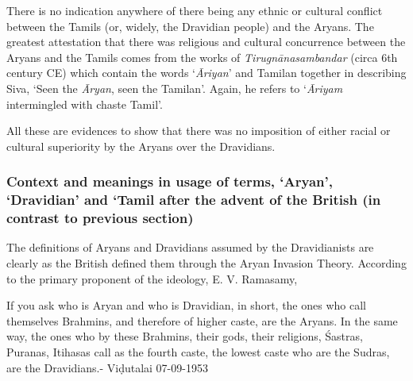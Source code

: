 There is no indication anywhere of there being any ethnic or cultural conflict between the Tamils (or, widely, the Dravidian people) and the Aryans. The greatest attestation that there was religious and cultural concurrence between the Aryans and the Tamils comes from the works of \textit{Tirugnānasambandar} (circa 6th century CE) which contain the words ‘\textit{Āriyan}’ and Tamilan together in describing Siva, ‘Seen the \textit{Āryan}, seen the Tamilan’. Again, he refers to ‘\textit{Āriyam} intermingled with chaste Tamil’.

All these are evidences to show that there was no imposition of either racial or cultural superiority by the Aryans over the Dravidians.


\subsubsection{Context and meanings in usage of terms, ‘Aryan’, ‘Dravidian’ and ‘Tamil after the advent of the British (in contrast to previous section)}

The definitions of Aryans and Dravidians assumed by the Dravidianists are clearly as the British defined them through the Aryan Invasion Theory. According to the primary proponent of the ideology, E. V. Ramasamy,

\begin{myquote}
If you ask who is Aryan and who is Dravidian, in short, the ones who call themselves Brahmins, and therefore of higher caste, are the Aryans. In the same way, the ones who by these Brahmins, their gods, their religions, Śastras, Puranas, Itihasas call as the fourth caste, the lowest caste who are the Sudras, are the Dravidians.\hfill - Viḍutalai 07-09-1953
\end{myquote}

